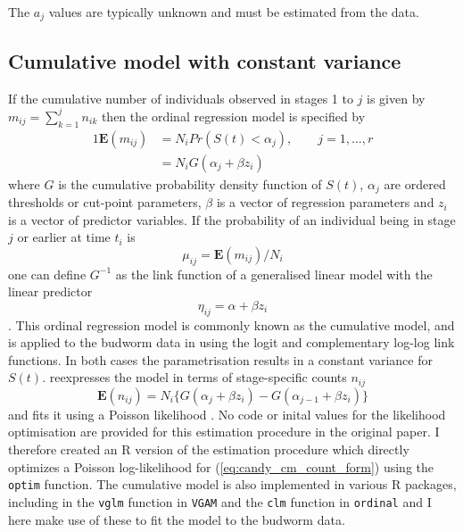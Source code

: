 The $a_j$ values are typically unknown and must be estimated from the data.

\subsection{Cumulative model with constant variance }
If the cumulative number of individuals observed in stages 1 to $j$ is given by $m_{ij}=\sum_{k=1}^jn_{ik}$ then the ordinal regression model \citep{mccullagh1980regression} is specified by %
\begin{alignat}{1}
\mathbf{E}(m_{ij})&=N_iPr(S(t) < \alpha_j), \qquad j = 1,\dots ,r\\
&=N_iG(\alpha_j + \beta z_i)
\end{alignat}
where $G$ is the cumulative probability density function of $S(t)$, $\alpha_j$ are ordered thresholds or cut-point parameters, $\beta$ is a vector of regression parameters and $z_i$ is a vector of predictor variables.
If the probability of an individual being in stage $j$ or earlier at time $t_i$ is $$\mu_{ij} = \mathbf{E}(m_{ij})/N_i$$ one can define $G^{-1}$ as the link function of a generalised linear model with the linear predictor $$\eta_{ij}=\alpha+\beta z_i$$. This ordinal regression model is commonly known as the cumulative model, and is applied to the budworm data in \citep{candy1991modeling} using the logit and complementary log-log link functions. In  both cases the parametrisation results in a constant variance for $S(t)$. \citet{candy1991modeling} reexpresses the model in terms of stage-specific counts $n_{ij}$  
\begin{equation}
\mathbf{E}(n_{ij})=N_i\{G(\alpha_j + \beta z_i) - G(\alpha_{j-1} + \beta z_i)\}
\label{eq:candy_cm_count_form}
\end{equation}
and fits it using a Poisson likelihood \citep{thompson1981composite}. No code or inital values for the likelihood optimisation are provided for this estimation procedure in the original paper.   I therefore created an R version of the estimation procedure which directly optimizes a Poisson log-likelihood for (\ref{eq:candy_cm_count_form}) using the \verb+optim+ function. The cumulative model is also implemented in various R packages, including in the \verb+vglm+ function in \verb+VGAM+ \citep{VGAM} and the \verb+clm+ function in \verb+ordinal+ \cite{ordinal} and I here make use of these to fit the model to the budworm data.

